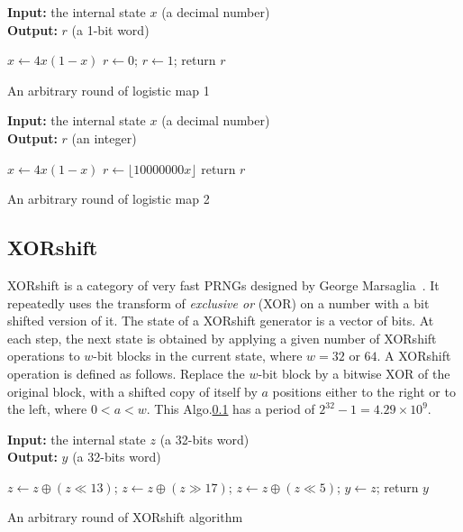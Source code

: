 \begin{algorithm}
\textbf{Input:} the internal state $x$ (a decimal number)\\
\textbf{Output:} $r$ (a 1-bit word)
\begin{algorithmic}[1]
\STATE$x\leftarrow{4x(1-x)}$
{
\STATE$r\leftarrow0$;	
}
\ELSE
{
\STATE$r\leftarrow1$;	
}\ENDIF
\STATE return $r$\;
\medskip
\caption{An arbitrary round of logistic map 1}
\label{logisticmap1}
\end{algorithmic}
\end{algorithm}

\begin{algorithm}
\textbf{Input:} the internal state $x$ (a decimal number)\\
\textbf{Output:} $r$ (an integer)
\begin{algorithmic}[1]
\STATE$x\leftarrow{4x(1-x)}$
\STATE$r\leftarrow{\lfloor10000000x\rfloor}$
\STATE return $r$\;
\medskip
\caption{An arbitrary round of logistic map 2}
\label{logisticmap2}
\end{algorithmic}
\end{algorithm}


\subsection{XORshift}
\label{XORshift}

XORshift is a category of very fast PRNGs designed by George Marsaglia~\cite{Marsaglia2003}. It repeatedly uses the transform of \emph{exclusive or} (XOR) on a number with a bit shifted version of it. The state of a XORshift generator is a vector of bits. At each step, the next state is obtained by applying a given number of XORshift operations to $w$-bit blocks in the current state, where $w = 32$ or $64$. A XORshift operation is defined as follows. Replace the $w$-bit block by a bitwise XOR of the original block, with a shifted copy of itself by $a$ positions either to the right or to the left, where $ 0 < a < w$. This Algo.\ref{XORshift} has a period of $2^{32}-1=4.29\times10^9$.


\begin{algorithm}
\textbf{Input:} the internal state $z$ (a 32-bits word)\\
\textbf{Output:} $y$ (a 32-bits word)
\begin{algorithmic}[1]

\STATE$z\leftarrow{z\oplus{(z\ll13)}}$;
\STATE$z\leftarrow{z\oplus{(z\gg17)}}$;
\STATE$z\leftarrow{z\oplus{(z\ll5)}}$;
\STATE$y\leftarrow{z}$;
\STATE return $y$\;
\medskip
\caption{An arbitrary round of XORshift algorithm}
\label{XORshift}
\end{algorithmic}
\end{algorithm}

